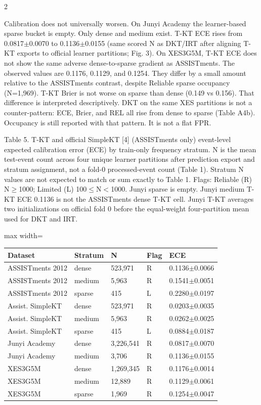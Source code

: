 \documentclass[10pt,a4paper]{article}
\begin{document}
\begin{multicols}{2}

Calibration does not universally worsen. On Junyi Academy the learner-based sparse bucket is empty. Only dense and medium exist. T-KT ECE rises from 0.0817$\pm$0.0070 to 0.1136$\pm$0.0155 (same scored N as DKT/IRT after aligning T-KT exports to official learner partitions; Fig. 3). On XES3G5M, T-KT ECE does not show the same adverse dense-to-sparse gradient as ASSISTments. The observed values are 0.1176, 0.1129, and 0.1254. They differ by a small amount relative to the ASSISTments contrast, despite Reliable sparse occupancy (N=1,969). T-KT Brier is not worse on sparse than dense (0.149 vs 0.156). That difference is interpreted descriptively. DKT on the same XES partitions is not a counter-pattern: ECE, Brier, and REL all rise from dense to sparse (Table A4b). Occupancy is still reported with that pattern. It is not a flat FPR.


\end{multicols}
\noindent\begin{minipage}{\textwidth}
\centering
{\fontsize{8}{9.5}\selectfont Table 5. T-KT and official SimpleKT [4] (ASSISTments only) event-level expected calibration error (ECE) by train-only frequency stratum. N is the mean test-event count across four unique learner partitions after prediction export and stratum assignment, not a fold-0 processed-event count (Table 1). Stratum N values are not expected to match or sum exactly to Table 1. Flags: Reliable (R) N$\geq$1000; Limited (L) 100$\leq$N$<$1000. Junyi sparse is empty. Junyi medium T-KT ECE 0.1136 is not the ASSISTments dense T-KT cell. Junyi T-KT averages two initializations on official fold 0 before the equal-weight four-partition mean used for DKT and IRT.\par}
\vspace{0.35em}
\begin{adjustbox}{max width=\textwidth}
{\small
\begin{tabular}{@{}lllll@{}}
\toprule
Dataset & Stratum & N & Flag & ECE \\
\midrule
ASSISTments 2012 & dense & 523,971 & R & 0.1136$\pm$0.0066 \\
ASSISTments 2012 & medium & 5,963 & R & 0.1541$\pm$0.0051 \\
ASSISTments 2012 & sparse & 415 & L & 0.2280$\pm$0.0197 \\
Assist. SimpleKT & dense & 523,971 & R & 0.0203$\pm$0.0035 \\
Assist. SimpleKT & medium & 5,963 & R & 0.0262$\pm$0.0025 \\
Assist. SimpleKT & sparse & 415 & L & 0.0884$\pm$0.0187 \\
Junyi Academy & dense & 3,226,541 & R & 0.0817$\pm$0.0070 \\
Junyi Academy & medium & 3,706 & R & 0.1136$\pm$0.0155 \\
XES3G5M & dense & 1,269,345 & R & 0.1176$\pm$0.0014 \\
XES3G5M & medium & 12,889 & R & 0.1129$\pm$0.0061 \\
XES3G5M & sparse & 1,969 & R & 0.1254$\pm$0.0047 \\
\bottomrule
\end{tabular}}
\end{adjustbox}
\end{minipage}
\end{document}
